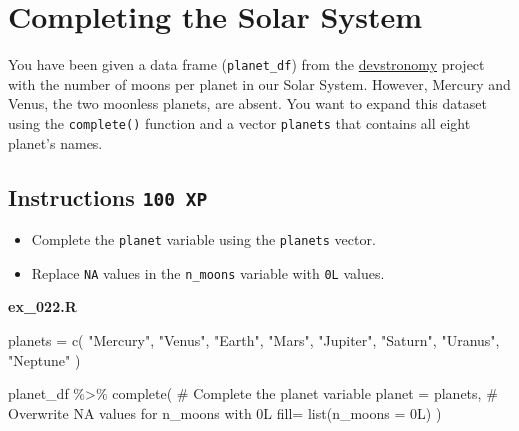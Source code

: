 \documentclass[
  letterpaper,
  DIV=11,
  numbers=noendperiod]{scrreprt}
\newenvironment{Shaded}{\begin{snugshade}}{\end{snugshade}}
\newcommand{\AttributeTok}[1]{\textcolor[rgb]{0.40,0.45,0.13}{#1}}
\newcommand{\CommentTok}[1]{\textcolor[rgb]{0.37,0.37,0.37}{#1}}
\newcommand{\FunctionTok}[1]{\textcolor[rgb]{0.28,0.35,0.67}{#1}}
\newcommand{\NormalTok}[1]{\textcolor[rgb]{0.00,0.23,0.31}{#1}}
\newcommand{\OtherTok}[1]{\textcolor[rgb]{0.00,0.23,0.31}{#1}}
\newcommand{\SpecialCharTok}[1]{\textcolor[rgb]{0.37,0.37,0.37}{#1}}
\newcommand{\StringTok}[1]{\textcolor[rgb]{0.13,0.47,0.30}{#1}}
\providecommand{\tightlist}{%
  \setlength{\itemsep}{0pt}\setlength{\parskip}{0pt}}\usepackage{longtable,booktabs,array}
\begin{document}
\hypertarget{completing-the-solar-system}{%
\section{Completing the Solar
System}\label{completing-the-solar-system}}

You have been given a data frame (\texttt{planet\_df}) from the
\href{https://devstronomy.com/\#/datasets}{devstronomy} project with the
number of moons per planet in our Solar System. However, Mercury and
Venus, the two moonless planets, are absent. You want to expand this
dataset using the \texttt{complete()} function and a vector
\texttt{planets} that contains all eight planet's names.

\hypertarget{instructions-100-xp-19}{%
\subsection*{\texorpdfstring{Instructions
\texttt{100\ XP}}{Instructions 100 XP}}\label{instructions-100-xp-19}}

\begin{itemize}
\tightlist
\item
  Complete the \texttt{planet} variable using the \texttt{planets}
  vector.
\item
  Replace \texttt{NA} values in the \texttt{n\_moons} variable with
  \texttt{0L} values.
\end{itemize}

\textbf{ex\_022.R}

\begin{Shaded}
\begin{Highlighting}[]
\NormalTok{planets }\OtherTok{=} \FunctionTok{c}\NormalTok{(}
    \StringTok{"Mercury"}\NormalTok{,}
    \StringTok{"Venus"}\NormalTok{,}
    \StringTok{"Earth"}\NormalTok{,}
    \StringTok{"Mars"}\NormalTok{,}
    \StringTok{"Jupiter"}\NormalTok{,}
    \StringTok{"Saturn"}\NormalTok{,}
    \StringTok{"Uranus"}\NormalTok{,}
    \StringTok{"Neptune"}
\NormalTok{)}

\NormalTok{planet\_df }\SpecialCharTok{\%\textgreater{}\%} 
  \FunctionTok{complete}\NormalTok{(}
    \CommentTok{\# Complete the planet variable}
    \AttributeTok{planet =}\NormalTok{  planets,}
    \CommentTok{\# Overwrite NA values for n\_moons with 0L}
    \AttributeTok{fill=} \FunctionTok{list}\NormalTok{(}\AttributeTok{n\_moons =}\NormalTok{ 0L)}
\NormalTok{  )}
\end{Highlighting}
\end{Shaded}
\end{document}
